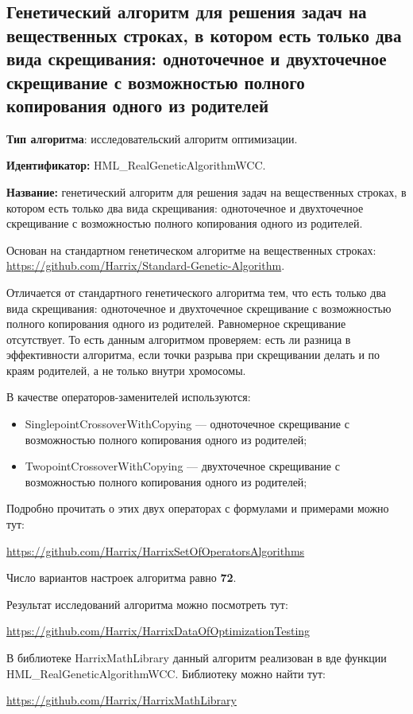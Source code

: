 \subsection{Генетический алгоритм для решения задач на вещественных строках, в котором есть только два вида скрещивания: одноточечное и двухточечное скрещивание с возможностью полного копирования одного из родителей}\label{HarrixOptimizationAlgorithms:HML_RealGeneticAlgorithmWCC}

\textbf{Тип алгоритма}: исследовательский алгоритм оптимизации.

\textbf{Идентификатор:} HML\_RealGeneticAlgorithmWCC.

\textbf{Название:} генетический алгоритм для решения задач на вещественных строках, в котором есть только два вида скрещивания: одноточечное и двухточечное скрещивание с возможностью полного копирования одного из родителей.

Основан на стандартном генетическом алгоритме на вещественных строках:  \href{https://github.com/Harrix/Standard-Genetic-Algorithm}{https://github.com/Harrix/Standard-Genetic-Algorithm}. 

Отличается от стандартного генетического алгоритма тем, что есть только два вида скрещивания: одноточечное и двухточечное скрещивание с возможностью полного копирования одного из родителей. Равномерное скрещивание отсутствует. То есть данным алгоритмом проверяем: есть ли разница в эффективности алгоритма, если точки разрыва при скрещивании делать и по краям родителей, а не только внутри хромосомы.

В качестве операторов-заменителей используются:
\begin{itemize}
\item SinglepointCrossoverWithCopying --- одноточечное скрещивание с возможностью полного копирования одного из родителей;
\item TwopointCrossoverWithCopying --- двухточечное скрещивание с возможностью полного копирования одного из родителей;
\end{itemize}

Подробно прочитать о этих двух операторах с формулами и примерами можно тут:

\href{https://github.com/Harrix/HarrixSetOfOperatorsAlgorithms}{https://github.com/Harrix/HarrixSetOfOperatorsAlgorithms}

Число вариантов настроек алгоритма равно \textbf{72}.

Результат исследований алгоритма можно посмотреть тут:

\href{https://github.com/Harrix/HarrixDataOfOptimizationTesting}{https://github.com/Harrix/HarrixDataOfOptimizationTesting}

В библиотеке HarrixMathLibrary данный алгоритм реализован в вде функции HML\_RealGeneticAlgorithmWCC. Библиотеку можно найти тут:

\href{https://github.com/Harrix/HarrixMathLibrary}{https://github.com/Harrix/HarrixMathLibrary}